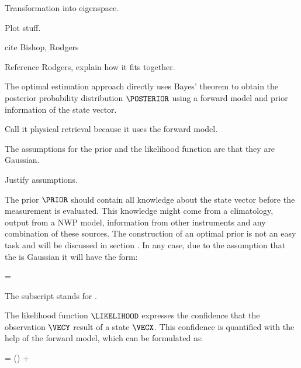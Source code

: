     \startsubsection[title=Maximum Likelihood Estimators for the Parameters]

    \stopsubsection

    \startsubsection[title=Marginalization,reference=ret_gauss_margin]

    \stopsubsection

    \startsubsection[title=Diagonalization of the Covariance Matrix]

        Transformation into eigenspace.

    \stopsubsection

    
    Plot stuff.

    cite Bishop, Rodgers

\stopsection


\startsection[title=Optimal Estimation]

    Reference Rodgers, explain how it fits together.

    The optimal estimation approach directly uses Bayes' theorem
     to obtain the posterior probability distribution
    $\POSTERIOR$ using a forward model and prior information of the state
    vector.

    Call it physical retrieval because it uses the forward model.

    The assumptions for the prior {\PDF} and the likelihood function
    are that they are Gaussian.

    Justify assumptions.

    The prior $\PRIOR$ should contain all knowledge about the state vector
    before the measurement is evaluated. This knowledge might come from
    a climatology, output from a NWP model, information from other instruments
    and any combination of these sources. The construction of an optimal prior
    is not an easy task and will be discussed in section .
    In any case, due to the assumption that the {\PDF} is Gaussian it will have
    the form:

    \startformula
        \PRIOR = \GAUSS{\VECX}{\MEANVECA}{\COVMATA}
    \stopformula

    The subscript stands for .

    The likelihood function $\LIKELIHOOD$ expresses the confidence that the
    observation $\VECY$ result of a state $\VECX$. This confidence is
    quantified with the help of the forward model, which can be formulated as:

    \startformula
        \VECY = \FWD(\VECX) + \ERR
    \stopformula

